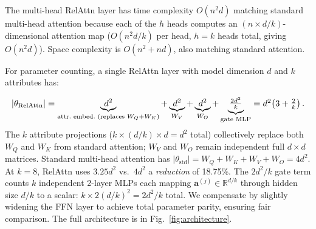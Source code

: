 \documentclass[conference]{IEEEtran}
\begin{document}

The multi-head RelAttn layer has time complexity $O(n^2 d)$ matching standard multi-head attention because each of the $h$ heads computes an $(n \times d/k)$-dimensional attention map ($O(n^2 d/k)$ per head, $h = k$ heads total, giving $O(n^2 d)$). Space complexity is $O(n^2 + nd)$, also matching standard attention.

For parameter counting, a single RelAttn layer with model dimension $d$ and $k$ attributes has:

\begin{equation}
	\resizebox{\columnwidth}{!}{$
		|\theta_{\mathrm{RelAttn}}| = \underbrace{d^2}_{\scriptstyle\text{attr.\ embed.\ (replaces }W_Q{+}W_K)} + \underbrace{d^2}_{\scriptstyle W_V} + \underbrace{d^2}_{\scriptstyle W_O} + \underbrace{\tfrac{2d^2}{k}}_{\scriptstyle\text{gate MLP}} = d^2\!\left(3 + \tfrac{2}{k}\right).
		$}
\end{equation}
The $k$ attribute projections ($k \times (d/k) \times d = d^2$ total) collectively replace both $W_Q$ and $W_K$ from standard attention; $W_V$ and $W_O$ remain independent full $d{\times}d$ matrices. Standard multi-head attention has $|\theta_{\mathrm{std}}| = W_Q + W_K + W_V + W_O = 4d^2$. At $k=8$, RelAttn uses $3.25d^2$ vs.\ $4d^2$ a \emph{reduction} of 18.75\%. The $2d^2/k$ gate term counts $k$ independent 2-layer MLPs each mapping $\mathbf{a}^{(j)}\!\in\!\mathbb{R}^{d/k}$ through hidden size $d/k$ to a scalar: $k \times 2(d/k)^2 = 2d^2/k$ total. We compensate by slightly widening the FFN layer to achieve total parameter parity, ensuring fair comparison.
The full architecture is in Fig.~\ref{fig:architecture}.
\end{document}

